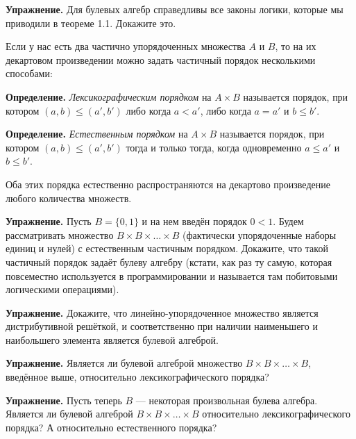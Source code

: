 {\bfseries Упражнение.} Для булевых алгебр справедливы все законы логики, которые мы приводили в теореме 1.1. Докажите это.

Если у нас есть два частично упорядоченных множества $A$ и $B$, то на их декартовом произведении можно задать частичный порядок несколькими способами:

{\bfseries Определение.} {\slshape Лексикографическим порядком} на $A\times B$ называется порядок, при котором $(a, b) \le (a', b')$ либо когда $a < a'$, либо когда $a=a'$ и $b\le b'$.

{\bfseries Определение.} {\slshape Естественным порядком} на $A\times B$ называется порядок, при котором $(a, b) \le (a', b')$ тогда и только тогда, когда одновременно $a \le a'$ и $b \le b'$.

Оба этих порядка естественно распространяются на декартово произведение любого количества множеств.

{\bfseries Упражнение.} Пусть $B = \{0, 1\}$ и на нем введён порядок $0 < 1$. Будем рассматривать множество $B\times B\times \ldots \times B$ (фактически упорядоченные наборы единиц и нулей) с естественным частичным порядком. Докажите, что такой частичный порядок задаёт булеву алгебру (кстати, как раз ту самую, которая повсеместно используется в программировании и называется там побитовыми логическими операциями).

{\bfseries Упражнение.} Докажите, что линейно-упорядоченное множество является дистрибутивной решёткой, и соответственно при наличии наименьшего и наибольшего элемента является булевой алгеброй.

{\bfseries Упражнение.} Является ли булевой алгеброй множество $B\times B \times \ldots \times B$, введённое выше, относительно лексикографического порядка?

{\bfseries Упражнение.} Пусть теперь $B$ — некоторая произвольная булева алгебра. Является ли булевой алгеброй $B\times B \times \ldots \times B$ относительно лексикографического порядка? А относительно естественного порядка?
